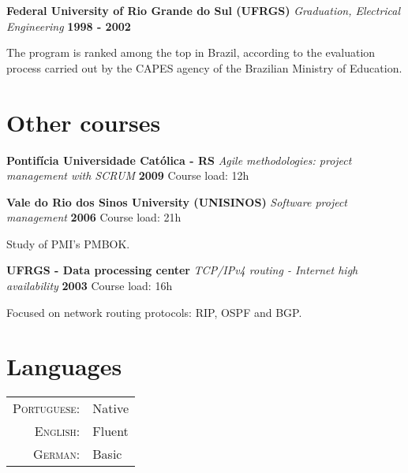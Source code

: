 \documentclass[margin,line]{resume}
\begin{document}
\begin{resume}
    

    

    \textbf{Federal University of Rio Grande do Sul (UFRGS)} \nl{}
    \textsl{Graduation, Electrical Engineering} \hfill \textbf{1998 - 2002}

    The program is ranked among the top in Brazil, according to the
evaluation process carried out by the CAPES agency of the Brazilian
Ministry of Education.


    


    \section{\mysidestyle Other courses}

    

    \textbf{Pontifícia Universidade Católica - RS} \nl{}
    \textsl{Agile methodologies: project management with SCRUM} \hfill \textbf{2009} \nl{}
    Course load: 12h

    

    

    \textbf{Vale do Rio dos Sinos University (UNISINOS)} \nl{}
    \textsl{Software project management} \hfill \textbf{2006} \nl{}
    Course load: 21h

    Study of PMI's PMBOK.


    

    \textbf{UFRGS - Data processing center} \nl{}
    \textsl{TCP/IPv4 routing - Internet high availability} \hfill \textbf{2003} \nl{}
    Course load: 16h

    Focused on network routing protocols: RIP, OSPF and BGP.


    


    \section{\mysidestyle Languages}

    \begin{tabular}{rl}
        
        \textsc{Portuguese:}&Native\\
        
        \textsc{English:}&Fluent\\
        
        \textsc{German:}&Basic\\
        

\end{tabular}
\end{resume}
\end{document}
